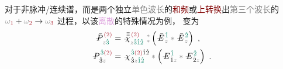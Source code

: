 对于\textcolor{NavyBlue}{非脉冲}/\textcolor{NavyBlue}{连续谱}，而是两个独立\textcolor{gray}{单色波长}的\textcolor{Maroon}{和频}或\textcolor{Maroon}{上转换}出\textcolor{gray}{第三个波长}的 $\mathcolor{gray}{\omega}_{\textcolor{Maroon}{1}} + \mathcolor{gray}{\omega}_{\textcolor{Maroon}{2}} \to \mathcolor{gray}{\omega}_{\textcolor{Maroon}{3}}$ 过程，以该\textcolor{Plum}{离散}的特殊情况为例， 变为
\begin{subequations} \label{eq:DP^(2)-3_12}
	\begin{align}
		\Xint{\mathcolor{gray}{-}}{30}{\bar{P}}^{\;\! \textcolor{Maroon}{(2)} }_{\;\! \mathcolor{gray}{z} \textcolor{PineGreen}{\hat{3}}} &= \Xint{{}^{}_{\mathcolor{gray}{-}}}{23}{\bar{\bar{\bar{\chi}}}}^{\;\!  \textcolor{Maroon}{(2)}}_{\mathcolor{gray}{z} \textcolor{PineGreen}{\hat{3} \hat{1} \hat{2}} } ~{}^{\mathcolor{gray}{*}}_{\mathcolor{gray}{*}} \left( \Xint{\mathcolor{gray}{-}}{295}{\bar{E}}^{\;\! \textcolor{PineGreen}{\hat{1}} }_{\;\! \mathcolor{gray}{z} } \mathcolor{gray}{*} \Xint{\mathcolor{gray}{-}}{295}{\bar{E}}^{\;\! \textcolor{PineGreen}{\hat{2}} }_{\;\! \mathcolor{gray}{z} } \right) ~, \label{eq:vec-DP^(2)-3_12} \\
		\Xint{\mathcolor{gray}{-}}{30}{P}^{\;\! \textcolor{PineGreen}{\hat{3}} \textcolor{Maroon}{(2)} }_{\;\! \hat{3}\mathcolor{gray}{z}} &= \Xint{{}^{}_{\mathcolor{gray}{-}}}{23}{\chi}^{\;\! \textcolor{PineGreen}{\hat{3}} \textcolor{Maroon}{(2)} \hat{1} \hat{2} }_{\;\! \hat{3} \mathcolor{gray}{z} \textcolor{PineGreen}{\hat{1} \hat{2}}} \mathcolor{gray}{*} \left( \Xint{\mathcolor{gray}{-}}{295}{E}^{\;\!\textcolor{PineGreen}{\hat{1}}}_{\;\! \hat{1} \mathcolor{gray}{z}} \mathcolor{gray}{*} \Xint{\mathcolor{gray}{-}}{295}{E}^{\;\!\textcolor{PineGreen}{\hat{2}}}_{\;\! \hat{2} \mathcolor{gray}{z}} \right) ~. \label{eq:components-DP^(2)-3_12}
	\end{align}
\end{subequations}

